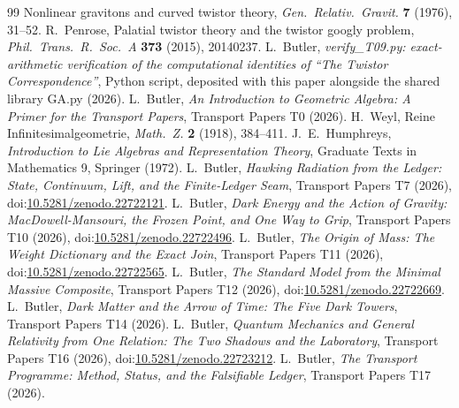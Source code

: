 \documentclass[11pt]{article}
\theoremstyle{definition}
\theoremstyle{plain}
\begin{document}
\begin{thebibliography}{99}
Nonlinear gravitons and curved twistor theory,
\emph{Gen.\ Relativ.\ Gravit.} \textbf{7} (1976), 31--52.
 R.~Penrose,
Palatial twistor theory and the twistor googly problem,
\emph{Phil.\ Trans.\ R.\ Soc.\ A} \textbf{373} (2015), 20140237.
 L.~Butler,
\emph{verify\_T09.py: exact-arithmetic verification of the computational identities of ``The Twistor Correspondence''},
Python script, deposited with this paper alongside the shared library GA.py (2026).
 L.~Butler,
\emph{An Introduction to Geometric Algebra: A Primer for the Transport Papers},
Transport Papers T0 (2026).
 H.~Weyl,
Reine Infinitesimalgeometrie,
\emph{Math.\ Z.} \textbf{2} (1918), 384--411.
 J.~E.~Humphreys,
\emph{Introduction to Lie Algebras and Representation Theory},
Graduate Texts in Mathematics 9, Springer (1972).
 L.~Butler,
\emph{Hawking Radiation from the Ledger: State, Continuum, Lift, and the Finite-Ledger Seam},
Transport Papers T7 (2026), doi:\href{https://doi.org/10.5281/zenodo.22722121}{10.5281/zenodo.22722121}.
 L.~Butler,
\emph{Dark Energy and the Action of Gravity: MacDowell-Mansouri, the Frozen Point, and One Way to Grip},
Transport Papers T10 (2026), doi:\href{https://doi.org/10.5281/zenodo.22722496}{10.5281/zenodo.22722496}.
 L.~Butler,
\emph{The Origin of Mass: The Weight Dictionary and the Exact Join},
Transport Papers T11 (2026), doi:\href{https://doi.org/10.5281/zenodo.22722565}{10.5281/zenodo.22722565}.
 L.~Butler,
\emph{The Standard Model from the Minimal Massive Composite},
Transport Papers T12 (2026), doi:\href{https://doi.org/10.5281/zenodo.22722669}{10.5281/zenodo.22722669}.
 L.~Butler,
\emph{Dark Matter and the Arrow of Time: The Five Dark Towers},
Transport Papers T14 (2026).
 L.~Butler,
\emph{Quantum Mechanics and General Relativity from One Relation: The Two Shadows and the Laboratory},
Transport Papers T16 (2026), doi:\href{https://doi.org/10.5281/zenodo.22723212}{10.5281/zenodo.22723212}.
 L.~Butler,
\emph{The Transport Programme: Method, Status, and the Falsifiable Ledger},
Transport Papers T17 (2026).
\end{thebibliography}
\end{document}
